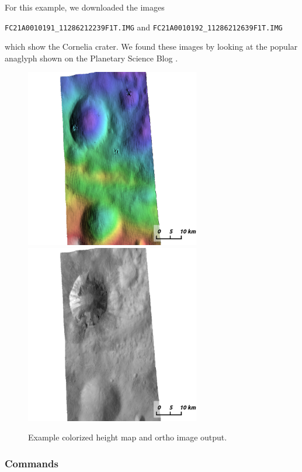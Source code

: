 For this example, we downloaded the images

\begin{center}
\texttt{FC21A0010191\_11286212239F1T.IMG} and
\texttt{FC21A0010192\_11286212639F1T.IMG}
\end{center}

which show the Cornelia crater. We found these images by looking at the
popular anaglyph shown on the Planetary Science Blog
\cite{planetaryblog:vesta}.

\begin{figure}[h!]
\centering
  \includegraphics[width=3.0in]{images/examples/dawn/VestaDEMRender_400px.png}
  \includegraphics[width=3.0in]{images/examples/dawn/VestaDRGRender_400px.png}
\caption{Example colorized height map and ortho image output.}
\label{fig:dawn-nomap-example}
\end{figure}

\subsubsection*{Commands}

